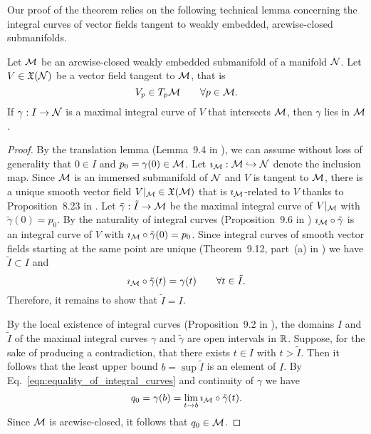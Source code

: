 \documentclass[twoside,11pt]{article}
\begin{document}
Our proof of the theorem relies on the following technical lemma concerning the integral curves of vector fields tangent to weakly embedded, arcwise-closed submanifolds.

\begin{lemma}
    \label{lem:integral_curve_tangency}
    Let ${\mathcal{M}}$ be an arcwise-closed weakly embedded submanifold of a manifold ${\mathcal{N}}$. 
    Let $V\in\mathfrak{X}({\mathcal{N}})$ be a vector field tangent to ${\mathcal{M}}$, that is
    \begin{equation}
        V_p \in T_p{\mathcal{M}} \qquad \forall p\in{\mathcal{M}}.
    \end{equation}
    If $\gamma:I \to {\mathcal{N}}$ is a maximal integral curve of $V$ that intersects ${\mathcal{M}}$, then $\gamma$ lies in ${\mathcal{M}}$.
\end{lemma}
\begin{proof}
    By the translation lemma (Lemma~9.4 in \cite{Lee2013introduction}), we can assume without loss of generality that $0\in I$ and $p_0 = \gamma(0)\in{\mathcal{M}}$.
    Let $\imath_{{\mathcal{M}}}:{\mathcal{M}} \hookrightarrow {\mathcal{N}}$ denote the inclusion map.
    Since ${\mathcal{M}}$ is an immersed submanifold of ${\mathcal{N}}$ and $V$ is tangent to ${\mathcal{M}}$, there is a unique smooth vector field $V\vert_{{\mathcal{M}}}\in\mathfrak{X}({\mathcal{M}})$ that is $\imath_{{\mathcal{M}}}$-related to $V$ thanks to Proposition~8.23 in \cite{Lee2013introduction}.
    Let $\tilde{\gamma}:\tilde{I} \to {\mathcal{M}}$ be the maximal integral curve of $V\vert_{{\mathcal{M}}}$ with $\tilde{\gamma}(0) = p_0$.
    By the naturality of integral curves (Proposition~9.6 in \cite{Lee2013introduction}) $\imath_{{\mathcal{M}}} \circ \tilde{\gamma}$ is an integral curve of $V$ with $\imath_{{\mathcal{M}}} \circ \tilde{\gamma}(0) = p_0$.
    Since integral curves of smooth vector fields starting at the same point are unique (Theorem~9.12, part~(a) in \cite{Lee2013introduction}) we have $\tilde{I} \subset I$ and 
    \begin{equation}
        \imath_{{\mathcal{M}}} \circ \tilde{\gamma}(t) = \gamma(t) \qquad \forall t \in \tilde{I}.
        \label{eqn:equality_of_integral_curves}
    \end{equation}
    Therefore, it remains to show that $\tilde{I} = I$.
    
    By the local existence of integral curves (Proposition~9.2 in \cite{Lee2013introduction}), the domains $I$ and $\tilde{I}$ of the maximal integral curves $\gamma$ and $\tilde{\gamma}$ are open intervals in $\mathbb{R}$.
    Suppose, for the sake of producing a contradiction, that there exists $t\in I$ with $t > \tilde{I}$.
    Then it follows that the least upper bound $b = \sup \tilde{I}$ is an element of $I$.
    By Eq.~\ref{eqn:equality_of_integral_curves} and continuity of $\gamma$ we have
    \begin{equation}
        q_0 = \gamma(b) = \lim_{t\to b} \imath_{{\mathcal{M}}} \circ \tilde{\gamma}(t).
        \label{eqn:upper_limit_of_integral_curve}
    \end{equation}
    Since ${\mathcal{M}}$ is arcwise-closed, it follows that $q_0 \in {\mathcal{M}}$.
    

\end{proof}
\end{document}
